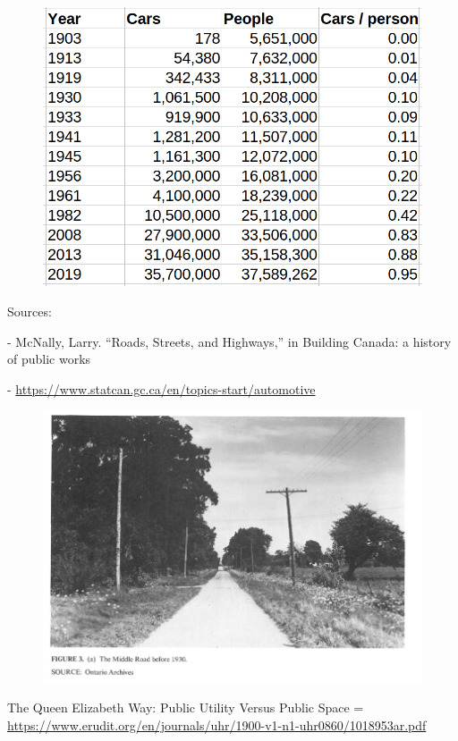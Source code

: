 \documentclass[aspectratio=169]{beamer}
\begin{document}
\begin{frame}
	
	\begin{figure}
		\centering
		\includegraphics[width=0.6\linewidth]{images/cars_ppl_canada.png}
		
	\end{figure}
	
	\tiny{
		Sources:
		
		- McNally, Larry. “Roads, Streets, and Highways,” in Building Canada: a history of public	works
		
		- \url{https://www.statcan.gc.ca/en/topics-start/automotive}	
}
	
\end{frame}




\begin{frame}
	
	\begin{figure}
		\centering
		\includegraphics[width=0.8\linewidth]{images/qew_1930.png}
		
	\end{figure}
	\tiny{The Queen Elizabeth Way: Public Utility Versus Public Space = \url{https://www.erudit.org/en/journals/uhr/1900-v1-n1-uhr0860/1018953ar.pdf}}
	
\end{frame}
\end{document}
